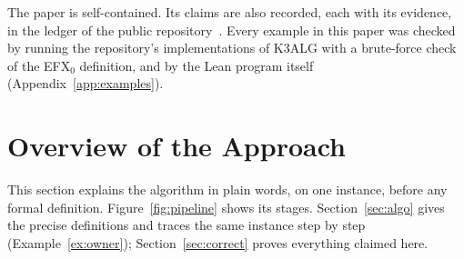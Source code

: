 \documentclass[runningheads,11pt]{llncs}
\newcommand{\efxz}{\texorpdfstring{\mbox{EFX$_0$}}{EFX0}}
\begin{document}
The paper is self-contained. Its claims are also recorded, each with its evidence, in the ledger of the public repository~\cite{Repo}. Every example in this paper was checked by running the repository's implementations of K3ALG with a brute-force check of the \efxz{} definition, and by the Lean program itself (Appendix~\ref{app:examples}).

\section{Overview of the Approach}\label{sec:overview}

This section explains the algorithm in plain words, on one instance, before any formal definition. Figure~\ref{fig:pipeline} shows its stages. Section~\ref{sec:algo} gives the precise definitions and traces the same instance step by step (Example~\ref{ex:owner}); Section~\ref{sec:correct} proves everything claimed here.
\end{document}
